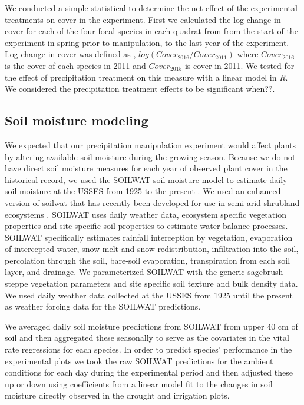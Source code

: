 \documentclass[11pt]{article}
\begin{document}
\begin{doublespacing}
We conducted a simple statistical to determine the net effect of the experimental treatments on cover in the experiment. First we calculated the log change in cover for each of the four focal species in each quadrat from from the start of the experiment in spring prior to manipulation, to the last year of the experiment. Log change in cover was defined as , $log(Cover_{2016}/Cover_{2011})$ where $Cover_{2016}$ is the cover of each species in 2011 and $Cover_{2015}$ is cover in 2011. We tested for the effect of precipitation treatment on this measure with a linear model in \textit{R}. We considered the precipitation treatment effects to be significant when??.


\subsection*{Soil moisture modeling}

We expected that our precipitation manipulation experiment would affect plants by altering available soil moisture during the growing season.  Because we do not have direct soil moisture measures for each year of observed plant cover in the historical record, we used the SOILWAT soil moisture model to estimate daily soil moisture at the USSES from 1925 to the present \citep{Parton 1978}. We used an enhanced version of soilwat that has recently been developed for use in semi-arid shrubland ecosystems \citep{Bradford}. SOILWAT uses daily weather data, ecosystem specific vegetation properties and site specific soil properties to estimate water balance processes. SOILWAT specifically estimates rainfall interception by vegetation, evaporation of intercepted water, snow melt and snow redistribution, infiltration into the soil, percolation through the soil, bare-soil evaporation, transpiration from each soil layer, and drainage. We parameterized SOILWAT with the generic sagebrush steppe vegetation parameters and site specific soil texture and bulk density data. We used daily weather data collected at the USSES from 1925 until the present as weather forcing data for the SOILWAT predictions.  

We averaged daily soil moisture predictions from SOILWAT from upper 40 cm of soil and then aggregated these seasonally to serve as the covariates in the vital rate regressions for each species. In order to predict species' performance in the experimental plots we took the raw SOILWAT predictions for the ambient conditions for each day during the experimental period and then adjusted these up or down using coefficients from a linear model fit to the changes in soil moisture directly observed in the drought and irrigation plots.  


\end{doublespacing}
\end{document}
